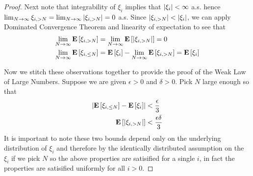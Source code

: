 \begin{proof}
Next note that integrability of $\xi_i$ implies that $\left \vert \xi_i \right \vert <
\infty$ a.s. hence $\lim_{N \to \infty} \xi_{i,>N} = \lim_{N \to
  \infty} \left \vert \xi_{i,>N} \right \vert  = 0$ a.s.  Since
$\left \vert \xi_{i,>N} \right \vert < \left \vert \xi_i \right \vert$, we can apply Dominated Convergence
Theorem and linearity of expectation to see that 
\begin{align*}
\lim_{N \to \infty} \textbf{E}\left[\xi_{i,>N}\right] &= \lim_{N \to \infty}
\textbf{E}\left[\left \vert \xi_{i,>N} \right \vert\right]   = 0 \\
\lim_{N \to \infty} \textbf{E}\left[\xi_{i,\leq N}\right] &=
\textbf{E}\left[\xi_i\right] - \lim_{N \to
  \infty} \textbf{E}\left[\xi_{i,> N}\right] = \textbf{E}\left[\xi_i\right]
\end{align*}

Now we stitch these observations together to provide the proof of the
Weak Law of Large Numbers.  Suppose we are given $\epsilon >0$ and $\delta > 0$.  Pick $N$ large enough so that 
\begin{align*}
\left \vert \textbf{E}\left[\xi_{i,\leq N}\right] - \textbf{E}\left[\xi_i\right] \right \vert &<
\frac{\epsilon}{3} \\
\textbf{E}\left[\left \vert \xi_{i,> N} \right \vert\right] &< \frac{\epsilon \delta}{3}
\end{align*}
It is important to note these two bounds depend only on the underlying
distribution of $\xi_i$ and therefore by the identically distributed assumption
on the $\xi_i$ if we pick $N$ so the above properties are satisified
for a single $i$, in fact the properties are satisified uniformly for
all $i > 0$.  


\end{proof}
